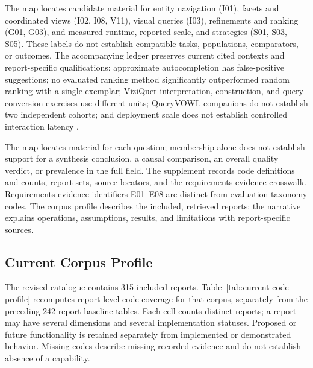 \documentclass[manuscript,review,screen]{acmart}
\begin{document}
The map locates candidate material for entity navigation (I01), facets and coordinated views (I02, I08, V11), visual queries (I03), refinements and ranking (G01, G03), and measured runtime, reported scale, and strategies (S01, S03, S05). These labels do not establish compatible tasks, populations, comparators, or outcomes. The accompanying ledger preserves current cited contexts and report-specific qualifications: approximate autocompletion has false-positive suggestions; no evaluated ranking method significantly outperformed random ranking with a single exemplar; ViziQuer interpretation, construction, and query-conversion exercises use different units; QueryVOWL companions do not establish two independent cohorts; and deployment scale does not establish controlled interaction latency \citep{2021_Parra_Fast_Approximate,2020_Lissandrini_Graph-Query_Suggestions,V3-01077,V3-01013,V3-02190,V3-02191,2022_Ikkala_Sampo-UI_A}.

The map locates material for each question; membership alone does not establish support for a synthesis conclusion, a causal comparison, an overall quality verdict, or prevalence in the full field. The supplement records code definitions and counts, report sets, source locators, and the requirements evidence crosswalk. Requirements evidence identifiers E01--E08 are distinct from evaluation taxonomy codes. The corpus profile describes the included, retrieved reports; the narrative explains operations, assumptions, results, and limitations with report-specific sources.

\subsection{Current Corpus Profile}
The revised catalogue contains 315 included reports. Table~\ref{tab:current-code-profile} recomputes report-level code coverage for that corpus, separately from the preceding 242-report baseline tables. Each cell counts distinct reports; a report may have several dimensions and several implementation statuses. Proposed or future functionality is retained separately from implemented or demonstrated behavior. Missing codes describe missing recorded evidence and do not establish absence of a capability.
\end{document}

